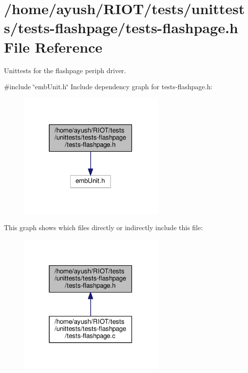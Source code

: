 \hypertarget{tests-flashpage_8h}{}\section{/home/ayush/\+R\+I\+O\+T/tests/unittests/tests-\/flashpage/tests-\/flashpage.h File Reference}
\label{tests-flashpage_8h}


Unittests for the {\ttfamily flashpage} periph driver.  


{\ttfamily \#include \char`\"{}emb\+Unit.\+h\char`\"{}}\newline
Include dependency graph for tests-\/flashpage.h\+:
\nopagebreak
\begin{figure}[H]
\begin{center}
\leavevmode
\includegraphics[width=207pt]{tests-flashpage_8h__incl}
\end{center}
\end{figure}
This graph shows which files directly or indirectly include this file\+:
\nopagebreak
\begin{figure}[H]
\begin{center}
\leavevmode
\includegraphics[width=207pt]{tests-flashpage_8h__dep__incl}
\end{center}
\end{figure}
